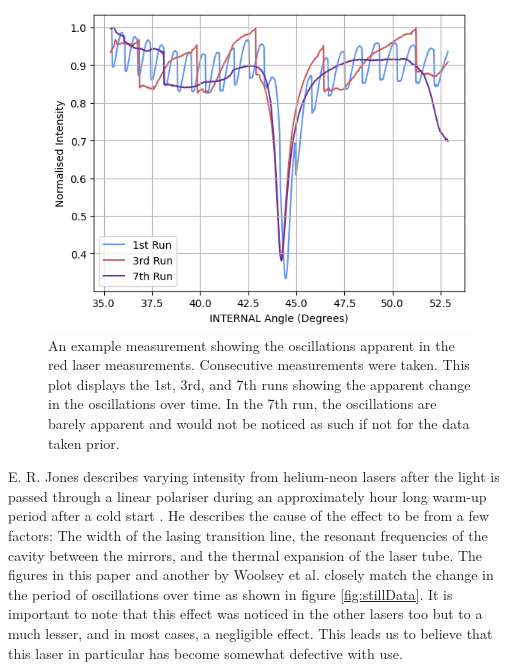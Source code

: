 \documentclass[%
reprint,
amsmath,amssymb,
aps,
]{revtex4-2}
\begin{document}
			\begin{figure}
				\includegraphics[width=0.85\columnwidth]{oscillationsExample.png}
				\caption{\label{fig:oscillationsExample}An example measurement showing the oscillations apparent in the red laser measurements. Consecutive measurements were taken. This plot displays the 1st, 3rd, and 7th runs showing the apparent change in the oscillations over time. In the 7th run, the oscillations are barely apparent and would not be noticed as such if not for the data taken prior.}
			\end{figure}
			
			E. R. Jones describes varying intensity from helium-neon lasers after the light is passed through a linear polariser during an approximately hour long warm-up period after a cold start \cite{jonesPolarisation}. He describes the cause of the effect to be from a few factors: The width of the lasing transition line, the resonant frequencies of the cavity between the mirrors, and the thermal expansion of the laser tube. The figures in this paper and another by Woolsey et al. \cite{woolseyPolarisation} closely match the change in the period of oscillations over time as shown in figure \ref{fig:stillData}. It is important to note that this effect was noticed in the other lasers too but to a much lesser, and in most cases, a negligible effect. This leads us to believe that this laser in particular has become somewhat defective with use.
			
\end{document}
